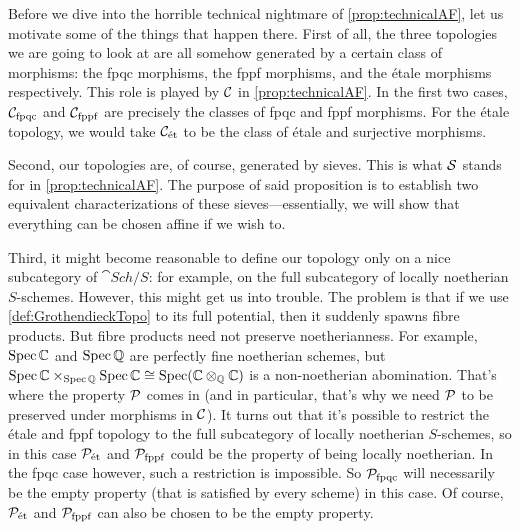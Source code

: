 \begin{rem*}\label{rem*:clarificationsForTechnicalAF}
	Before we dive into the horrible technical nightmare of \cref{prop:technicalAF}, let us motivate some of the things that happen there. First of all, the three topologies we are going to look at are all somehow generated by a certain class of morphisms: the fpqc morphisms, the fppf morphisms, and the étale morphisms respectively. This role is played by $\mathcal{C}$ in \cref{prop:technicalAF}. In the first two cases, $\mathcal{C}_{\mathrm{fpqc}}$ and $\mathcal{C}_{\mathrm{fppf}}$ are precisely the classes of fpqc and fppf morphisms. For the étale topology, we would take $\mathcal{C}_{\mathrm{\acute{e}t}}$ to be the class of étale and surjective morphisms.
	
	Second, our topologies are, of course, generated by sieves. This is what $\mathcal{S}$ stands for in \cref{prop:technicalAF}. The purpose of said proposition is to establish two equivalent characterizations of these sieves---essentially, we will show that everything can be chosen affine if we wish to.
	
	Third, it might become reasonable to define our topology only on a nice subcategory of $\cat{Sch}/S$: for example, on the full subcategory of locally noetherian $S$-schemes. However, this might get us into trouble. The problem is that if we use \cref{def:GrothendieckTopo} to its full potential, then it suddenly spawns fibre products. But fibre products need not preserve noetherianness. For example, $\operatorname{Spec} \mathbb{C}$ and $\operatorname{Spec} \mathbb{Q}$ are perfectly fine noetherian schemes, but $\operatorname{Spec} \mathbb{C}\times_{\operatorname{Spec} \mathbb{Q}}\operatorname{Spec} \mathbb{C}\cong \operatorname{Spec} (\mathbb{C}\otimes_{\mathbb{Q}}\mathbb{C})$ is a non-noetherian abomination. That's where the property $\mathcal{P}$ comes in (and in particular, that's why we need $\mathcal{P}$ to be preserved under morphisms in $\mathcal{C}$). It turns out that it's possible to restrict the étale and fppf topology to the full subcategory of locally noetherian $S$-schemes, so in this case $\mathcal{P}_{\mathrm{\acute{e}t}}$ and $\mathcal{P}_{\mathrm{fppf}}$ could be the property of being locally noetherian. In the fpqc case however, such a restriction is impossible. So $\mathcal{P}_{\mathrm{fpqc}}$ will necessarily be the empty property (that is satisfied by every scheme) in this case. Of course, $\mathcal{P}_{\mathrm{\acute{e}t}}$ and $\mathcal{P}_{\mathrm{fppf}}$ can also be chosen to be the empty property.
\end{rem*}
